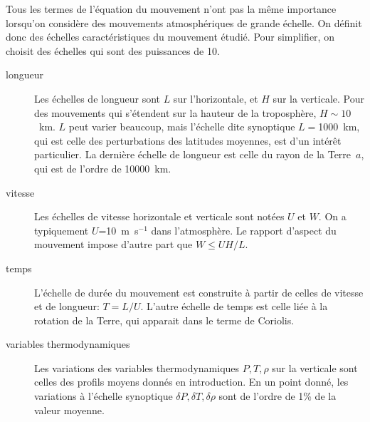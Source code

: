 \sk
Tous les termes de l'équation du mouvement n'ont pas la même importance lorsqu'on considère des mouvements atmosphériques de grande échelle. On définit donc des échelles caractéristiques du mouvement étudié. Pour simplifier, on choisit des échelles qui sont des puissances de 10.
\begin{description}
\item[longueur] Les échelles de longueur sont $L$ sur l'horizontale, et $H$ sur la verticale. Pour des mouvements qui s'étendent sur la hauteur de la troposphère, $H\sim 10$~km. $L$ peut varier beaucoup, mais l'échelle dite synoptique $L=$1000~km, qui est celle des perturbations des latitudes moyennes, est d'un intérêt particulier. La dernière échelle de longueur est celle du rayon de la Terre~$a$, qui est de l'ordre de 10000~km. 
\item[vitesse] Les échelles de vitesse horizontale et verticale sont notées $U$ et $W$. On a typiquement $U$=10~m~s$^{-1}$ dans l'atmosphère. Le rapport d'aspect du mouvement impose d'autre part que $W\le UH/L$.
\item[temps] L'échelle de durée du mouvement est construite à partir de celles de vitesse et de longueur: $T=L/U$. L'autre échelle de temps est celle liée à la rotation de la Terre, qui apparait dans le terme de Coriolis.
\item[variables thermodynamiques] Les variations des variables thermodynamiques $P,T,\rho$ sur la verticale sont celles des profils moyens donnés en introduction. En un point donné, les variations à l'échelle synoptique $\delta P,\delta T,\delta\rho$ sont de l'ordre de 1\% de la valeur moyenne.
\end{description}



